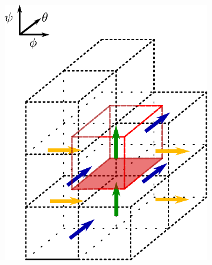 \begin{figure}[H]
\begin{subfigure}[b]{0.24\textwidth}
		\includegraphics[width=1\textwidth]{schemes/BoundingBoxFluxPsiDiffPerp.pdf}
		\label{fig:StaggeredFluxPsi}
	\end{subfigure}
	\begin{subfigure}[b]{0.24\textwidth}
		\centering

\end{subfigure}
\end{figure}
